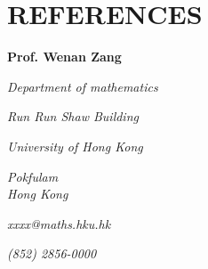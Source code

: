 \documentclass[paper=a4,fontsize=11pt]{scrartcl}	 			%
\newcommand{\sepspace}{\vspace*{1em}}			%
\newcommand{\NewPart}[1]{\section*{\uppercase{#1}}}
\newcommand{\EducationEntry}[4]{
		\noindent \textbf{#1} \hfill 					%
		\colorbox{White}{%
			\parbox{10em}{%
			\hfill\color{Black}#2}} \par				%
		\noindent\hangindent=2em\hangafter=0 #3 \par					%
		\noindent\hangindent=2em\hangafter=0 #4 	%
		\normalsize \par}
\newcommand{\WorkEntry}[4]{						%
		\noindent \textbf{#1} \hfill 					%
		\colorbox{White}{\color{Black}#2} \par		%
		\noindent \textit{#3} \par					%
		\noindent \small #4 	%
		\normalsize \par}
\newcommand{\RefEntry}[7]{						%
		\noindent \textbf{#1} \par 					%
		\noindent \textit{#2} \par	%
		\noindent \textit{#3} \par
		\noindent \textit{#4} \par%
		\noindent \textit{#5} \par
		\noindent \textit{#6} \par
		\noindent \textit{#7} \par
		}
\begin{document}
\NewPart{References}
\RefEntry{Prof. Wenan Zang}{Department of mathematics}{Run Run Shaw Building}{University of Hong Kong}{Pokfulam\\Hong Kong}{xxxx@maths.hku.hk}{(852) 2856-0000\\}


%
%
%
\end{document}
